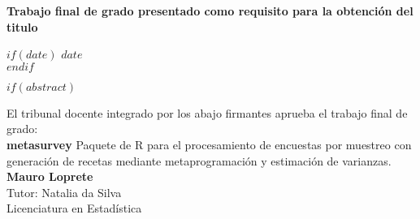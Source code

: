 \begin{titlepage}
\begin{center}
\vfill

\large \textbf{Trabajo final de grado presentado como requisito para la obtención del titulo \degreename}\\[0.3cm] %
 
\vfill

$if(date)$
{\large $date$}\\[4cm] %
$endif$




 
\vfill
\end{center}
\end{titlepage}



$if(abstract)$

\begin{abstract}
\addchaptertocentry{\abstractname} %
$abstract$
\end{abstract}

\newpage

\begin{center}
    El tribunal docente integrado por los abajo firmantes aprueba el trabajo final de grado:\\
    \medskip
    \vspace{1cm}
    \textbf{\large metasurvey} Paquete de R para el procesamiento de encuestas por muestreo con generación de recetas mediante metaprogramación y estimación de varianzas.\\
    \vspace{2cm}
    \textbf{Mauro Loprete}\\
    \vspace{1cm}
    \noindent Tutor: Natalia da Silva\\
    \vspace{1cm}
    Licenciatura en Estadística\\
    \end{center}
    \vspace{3cm}
    
